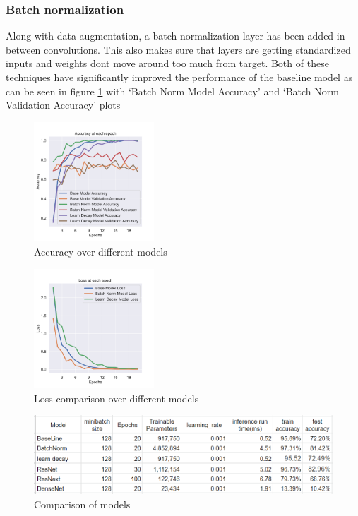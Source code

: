 \documentclass[conference]{IEEEtran}
\begin{document}
		\subsubsection{Batch normalization}
		Along with data augmentation, a batch normalization layer has been added in between convolutions. This also makes sure that layers are getting standardized inputs and weights dont move around too much from target. Both of these techniques have significantly improved the performance of the baseline model as can be seen in figure  \ref{fig:base_line_accuracy_compare} with `Batch Norm Model Accuracy' and `Batch Norm Validation Accuracy' plots
%		
		\begin{figure}
			\centering
			\includegraphics[width=0.4\textwidth]{compare_graphs/baseline_model_accuracy_compare.png}
			\caption{Accuracy over different models}
			\label{fig:base_line_accuracy_compare}
		\end{figure}
%	
		\begin{figure}
			\centering
			\includegraphics[width=0.4\textwidth]{compare_graphs/baseline_model_loss_compare.png}
			\caption{Loss comparison over different models}
			\label{fig:base_line_loss_compare}
		\end{figure}
	
		\begin{figure}[!h]
		\centering
		\includegraphics[width=\textwidth]{hyperparams/allmodels.png}
		\caption{\label{fig:hyper_params_allmodels}Comparison of models}
		\end{figure}
	
\end{document}
